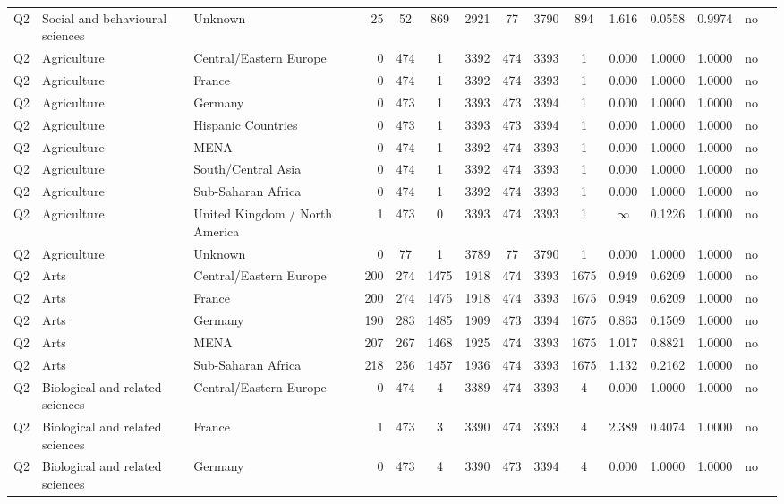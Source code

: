 \begin{longtable}{lllrcccccccccll}
Q2 & Social and behavioural sciences & Unknown & 25 & 52 & 869 & 2921 & 77 & 3790 & 894 & 1.616 & 0.0558 & 0.9974 & no \\
Q2 & Agriculture & Central/Eastern Europe & 0 & 474 & 1 & 3392 & 474 & 3393 & 1 & 0.000 & 1.0000 & 1.0000 & no \\
Q2 & Agriculture & France & 0 & 474 & 1 & 3392 & 474 & 3393 & 1 & 0.000 & 1.0000 & 1.0000 & no \\
Q2 & Agriculture & Germany & 0 & 473 & 1 & 3393 & 473 & 3394 & 1 & 0.000 & 1.0000 & 1.0000 & no \\
Q2 & Agriculture & Hispanic Countries & 0 & 473 & 1 & 3393 & 473 & 3394 & 1 & 0.000 & 1.0000 & 1.0000 & no \\
Q2 & Agriculture & MENA & 0 & 474 & 1 & 3392 & 474 & 3393 & 1 & 0.000 & 1.0000 & 1.0000 & no \\
Q2 & Agriculture & South/Central Asia & 0 & 474 & 1 & 3392 & 474 & 3393 & 1 & 0.000 & 1.0000 & 1.0000 & no \\
Q2 & Agriculture & Sub-Saharan Africa & 0 & 474 & 1 & 3392 & 474 & 3393 & 1 & 0.000 & 1.0000 & 1.0000 & no \\
Q2 & Agriculture & United Kingdom / North America & 1 & 473 & 0 & 3393 & 474 & 3393 & 1 & $\infty$ & 0.1226 & 1.0000 & no \\
Q2 & Agriculture & Unknown & 0 & 77 & 1 & 3789 & 77 & 3790 & 1 & 0.000 & 1.0000 & 1.0000 & no \\
Q2 & Arts & Central/Eastern Europe & 200 & 274 & 1475 & 1918 & 474 & 3393 & 1675 & 0.949 & 0.6209 & 1.0000 & no \\
Q2 & Arts & France & 200 & 274 & 1475 & 1918 & 474 & 3393 & 1675 & 0.949 & 0.6209 & 1.0000 & no \\
Q2 & Arts & Germany & 190 & 283 & 1485 & 1909 & 473 & 3394 & 1675 & 0.863 & 0.1509 & 1.0000 & no \\
Q2 & Arts & MENA & 207 & 267 & 1468 & 1925 & 474 & 3393 & 1675 & 1.017 & 0.8821 & 1.0000 & no \\
Q2 & Arts & Sub-Saharan Africa & 218 & 256 & 1457 & 1936 & 474 & 3393 & 1675 & 1.132 & 0.2162 & 1.0000 & no \\
Q2 & Biological and related sciences & Central/Eastern Europe & 0 & 474 & 4 & 3389 & 474 & 3393 & 4 & 0.000 & 1.0000 & 1.0000 & no \\
Q2 & Biological and related sciences & France & 1 & 473 & 3 & 3390 & 474 & 3393 & 4 & 2.389 & 0.4074 & 1.0000 & no \\
Q2 & Biological and related sciences & Germany & 0 & 473 & 4 & 3390 & 473 & 3394 & 4 & 0.000 & 1.0000 & 1.0000 & no \\

\end{longtable}
